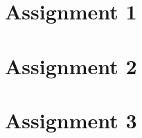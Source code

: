 \documentclass[12pt,letterpaper]{report}
\begin{document}
 
 \tableofcontents
 \chapter{Assignment 1}
 
 
 \chapter{Assignment 2}
 
 \chapter{Assignment 3}
 
\end{document}
